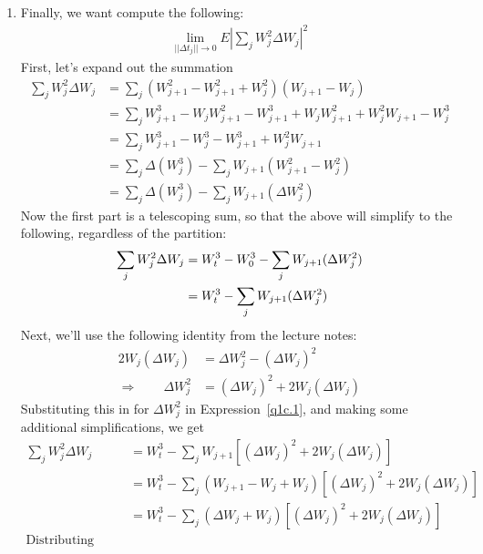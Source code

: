 \documentclass[12pt]{article}
\theoremstyle{plain}
\theoremstyle{definition}
\theoremstyle{remark}
\begin{document}
\begin{enumerate}
\begin{enumerate}
    \item %
      Finally, we want compute the following:
      \begin{align*}
        \lim_{||\Delta t_j||\rightarrow 0}
        E\left\lvert \sum_j W_j^2 \Delta W_j\right\rvert^2
      \end{align*}
      First, let's expand out the summation
      \begin{align*}
        \sum_j W_j^2 \Delta W_j
        &= \sum_j (W_{j+1}^2 -W_{j+1}^2 + W_j^2) ( W_{j+1} - W_j)\\
        &= \sum_j W_{j+1}^3 - W_{j}W_{j+1}^2 - W_{j+1}^3
          + W_{j}W_{j+1}^2 + W_{j}^2W_{j+1} - W_{j}^3\\
        &= \sum_j W_{j+1}^3 - W_{j}^3 - W_{j+1}^3 + W_{j}^2W_{j+1}\\
        &= \sum_j \Delta(W^3_{j}) - \sum_j W_{j+1}( W_{j+1}^2 - W_{j}^2)\\
        &= \sum_j \Delta(W^3_{j}) - \sum_j W_{j+1}(\Delta W_{j}^2)
      \end{align*}
      Now the first part is a telescoping sum, so that the above will
      simplify to the following, regardless of the partition:
      \begin{align}
        \sum_j W_j^2 \Delta W_j
        &= W^3_t - W^3_0 - \sum_j W_{j+1}(\Delta W_{j}^2)\notag\\
        &= W^3_t - \sum_j W_{j+1}(\Delta W_{j}^2)
        \label{q1c.1}
      \end{align}
      Next, we'll use the following identity from the lecture notes:
      \begin{align*}
        2 W_j (\Delta W_j) &= \Delta W_j^2 - (\Delta W_j)^2 \\
        \Rightarrow \qquad
        \Delta W_j^2 &= (\Delta W_j)^2  +  2 W_j (\Delta W_j)
      \end{align*}
      Substituting this in for $\Delta W_j^2$ in Expression~\ref{q1c.1},
      and making some additional simplifications, we get
      \begin{align*}
        \sum_j W_j^2 \Delta W_j
        &= W^3_t - \sum_j W_{j+1}
          \left[(\Delta W_j)^2  +  2 W_j (\Delta W_j)\right]\\
        &= W^3_t - \sum_j (W_{j+1}-W_j + W_j)
          \left[(\Delta W_j)^2  +  2 W_j (\Delta W_j)\right]\\
        &= W^3_t - \sum_j (\Delta W_{j}+ W_j)
          \left[(\Delta W_j)^2  +  2 W_j (\Delta W_j)\right]\\
        \text{Distributing} \qquad

\end{align*}
\end{enumerate}
\end{enumerate}
\end{document}
